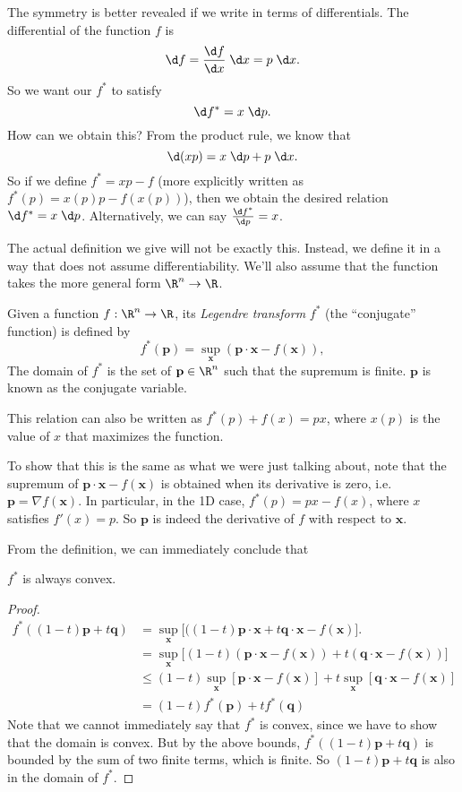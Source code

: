 \documentclass[a4paper]{article}
\begin{document}
The symmetry is better revealed if we write in terms of differentials. The differential of the function $f$ is
\[
  \d f = \frac{\d f}{\d x}\;\d x = p\;\d x.
\]
So we want our $f^*$ to satisfy
\[
  \d f^* = x\;\d p.
\]
How can we obtain this? From the product rule, we know that
\[
  \d (xp) = x\;\d p + p\;\d x.
\]
So if we define $f^* = xp - f$ (more explicitly written as $f^*(p) = x(p)p - f(x(p))$), then we obtain the desired relation $\d f^* = x\;\d p$. Alternatively, we can say $\frac{\d f^*}{\d p} = x$.

The actual definition we give will not be exactly this. Instead, we define it in a way that does not assume differentiability. We'll also assume that the function takes the more general form $\R^n \to \R$.
\begin{defi}
  Given a function $f: \R^n \to \R$, its \emph{Legendre transform} $f^*$ (the ``conjugate'' function) is defined by
  \[
    f^*(\mathbf{p}) = \sup_{\mathbf{x}}(\mathbf{p}\cdot \mathbf{x} - f(\mathbf{x})),
  \]
  The domain of $f^*$ is the set of $\mathbf{p}\in \R^n$ such that the supremum is finite. $\mathbf{p}$ is known as the conjugate variable.
\end{defi}
This relation can also be written as $f^*(p) + f(x) = px$, where $x(p)$ is the value of $x$ that maximizes the function.

To show that this is the same as what we were just talking about, note that the supremum of $\mathbf{p}\cdot \mathbf{x} - f(\mathbf{x})$ is obtained when its derivative is zero, i.e.\ $\mathbf{p} = \nabla f(\mathbf{x})$. In particular, in the 1D case, $f^*(p) = px - f(x)$, where $x$ satisfies $f'(x) = p$. So $\mathbf{p}$ is indeed the derivative of $f$ with respect to $\mathbf{x}$.

From the definition, we can immediately conclude that
\begin{lemma}
  $f^*$ is always convex.
\end{lemma}

\begin{proof}
  \begin{align*}
    f^*((1 - t)\mathbf{p} + t\mathbf{q}) &= \sup_\mathbf{x} \big[((1 - t)\mathbf{p}\cdot \mathbf{x} + t\mathbf{q}\cdot \mathbf{x} - f(\mathbf{x})\big].\\
    &= \sup_\mathbf{x} \big[(1 - t)(\mathbf{p}\cdot \mathbf{x} - f(\mathbf{x})) + t(\mathbf{q}\cdot \mathbf{x} - f(\mathbf{x}))\big]\\
    &\leq (1 - t)\sup_\mathbf{x} [\mathbf{p}\cdot \mathbf{x} - f(\mathbf{x})] + t\sup_\mathbf{x}[\mathbf{q}\cdot \mathbf{x} - f(\mathbf{x})]\\
    &= (1 - t)f^*(\mathbf{p}) + tf^*(\mathbf{q})
  \end{align*}
  Note that we cannot immediately say that $f^*$ is convex, since we have to show that the domain is convex. But by the above bounds, $f^*((1 - t)\mathbf{p} + t\mathbf{q})$ is bounded by the sum of two finite terms, which is finite. So $(1 - t)\mathbf{p} + t\mathbf{q}$ is also in the domain of $f^*$.
\end{proof}
\end{document}

